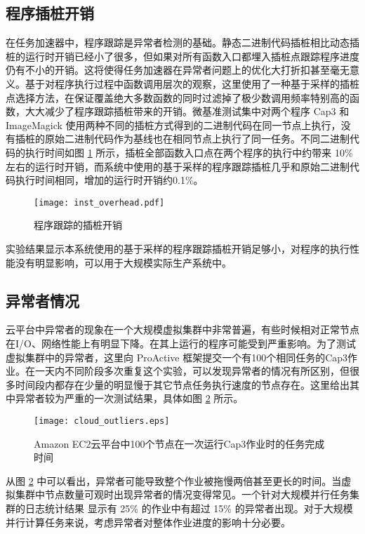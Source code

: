 \subsection{程序插桩开销}
\label{sec:no2_overhead}
在任务加速器中，程序跟踪是异常者检测的基础。静态二进制代码插桩相比动态插桩的运行时开销已经小了很多，但如果对所有函数入口都埋入插桩点跟踪程序进度仍有不小的开销。这将使得任务加速器在异常者问题上的优化大打折扣甚至毫无意义。基于对程序执行过程中函数调用层次的观察，这里使用了一种基于采样的插桩点选择方法，在保证覆盖绝大多数函数的同时过滤掉了极少数调用频率特别高的函数，大大减少了程序跟踪插桩带来的开销。微基准测试集中对两个程序 Cap3 和 ImageMagick 使用两种不同的插桩方式得到的二进制代码在同一节点上执行，没有插桩的原始二进制代码作为基线也在相同节点上执行了同一任务。不同二进制代码的执行时间如图 \ref{figure:inst_overhead} 所示，插桩全部函数入口点在两个程序的执行中约带来 10\% 左右的运行时开销，而系统中使用的基于采样的程序跟踪插桩几乎和原始二进制代码执行时间相同，增加的运行时开销约0.1\%。

\begin{figure}
  \centering
  \texttt{[image: inst\_overhead.pdf]}
  \caption{程序跟踪的插桩开销}
  \label{figure:inst_overhead}
\end{figure}

实验结果显示本系统使用的基于采样的程序跟踪插桩开销足够小，对程序的执行性能没有明显影响，可以用于大规模实际生产系统中。

\subsection{异常者情况}
云平台中异常者的现象在一个大规模虚拟集群中非常普遍，有些时候相对正常节点在I/O、网络性能上有明显下降。在其上运行的程序可能受到严重影响。为了测试虚拟集群中的异常者，这里向 ProActive 框架提交一个有100个相同任务的Cap3作业。在一天内不同阶段多次重复这个实验，可以发现异常者的情况有所区别，但很多时间段内都存在少量的明显慢于其它节点任务执行速度的节点存在。这里给出其中异常者较为严重的一次测试结果，具体如图 \ref{figure:outlier_cloud} 所示。
\begin{figure}
  \centering
  \texttt{[image: cloud\_outliers.eps]}
  \caption{Amazon EC2云平台中100个节点在一次运行Cap3作业时的任务完成时间}
  \label{figure:outlier_cloud}
\end{figure}

从图 \ref{figure:outlier_cloud} 中可以看出，异常者可能导致整个作业被拖慢两倍甚至更长的时间。当虚拟集群中节点数量可观时出现异常者的情况变得常见。一个针对大规模并行任务集群的日志统计结果 \cite{Ananthanarayanan:2010:ROM:1924943.1924962} 显示有 25\% 的作业中有超过 15\% 的异常者出现。对于大规模并行计算任务来说，考虑异常者对整体作业进度的影响十分必要。

